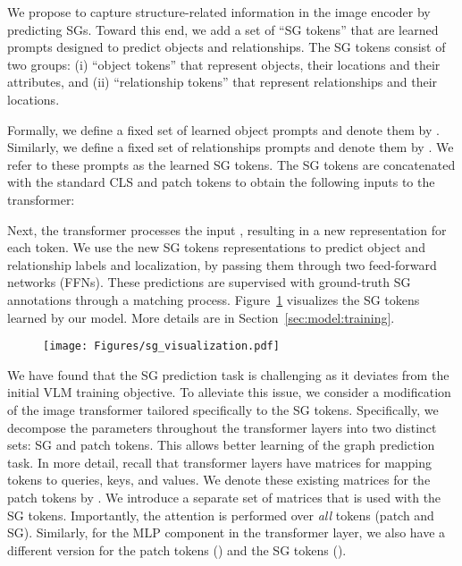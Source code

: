 \documentclass[11pt]{article}
\def\Secref#1{Section~\ref{#1}}
\newcommand{\minisection}[1]{\noindent{\textbf{#1}.}}
\newcommand{\figgref}[1]{Figure~\ref{#1}}
\def\Secref#1{Section~\ref{#1}}
\begin{document}
\minisection{Scene Graphs Tokens} We propose to capture structure-related information in the image encoder by predicting SGs. Toward this end, we add a set of ``SG tokens'' that are learned prompts designed to predict objects and relationships. The SG tokens consist of two groups: (i) ``object tokens'' that represent objects, their locations and their attributes, and (ii) ``relationship tokens'' that represent relationships and their locations.

Formally, we define a fixed set of  learned object prompts and denote them by . Similarly, we define a fixed set of  relationships prompts and denote them by . We refer to these prompts as the learned SG tokens. 
The SG tokens are concatenated with the standard CLS and patch tokens to obtain the following inputs to the transformer:


Next, the transformer processes the input , resulting in a new representation for each token. We use the new SG tokens representations to predict object and relationship labels and localization, by passing them through two feed-forward networks (FFNs). These predictions are supervised with ground-truth SG annotations through a matching process. \figgref{fig:sg_visualization} visualizes the SG tokens learned by our model. More details are in \Secref{sec:model:training}. 

 \begin{figure}
\centering
    \texttt{[image: Figures/sg\_visualization.pdf]}
    \vspace{-8mm}
    \label{fig:sg_visualization}
    \vspace{-2mm}
\end{figure}








\minisection{Adaptive SG tokens}
We have found that the SG prediction task is challenging as it deviates from the initial VLM training objective. To alleviate this issue, we consider a modification of the image transformer tailored specifically to the SG tokens. Specifically, we decompose the parameters throughout the transformer layers into two distinct sets: SG and patch tokens. This allows better learning of the graph prediction task. 
In more detail, recall that transformer layers have matrices for mapping tokens to queries, keys, and values. We denote these existing matrices for the patch tokens by . We introduce a separate set of matrices  that is used with the SG tokens. Importantly, the attention is performed over {\em all} tokens (patch and SG). Similarly, for the MLP component in the transformer layer, we also have a different version for the patch tokens () and the SG tokens (). 
\end{document}
